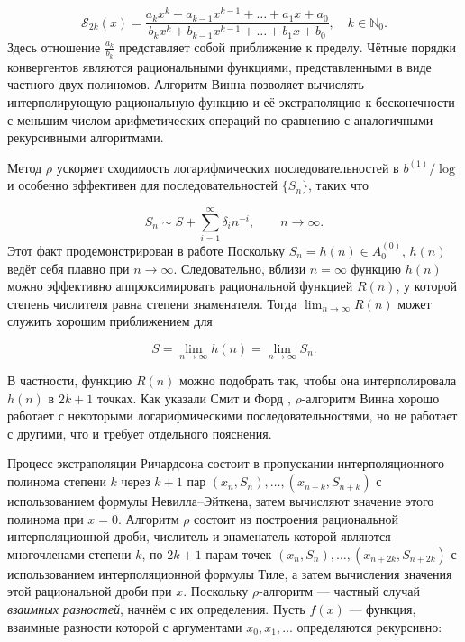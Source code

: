 \documentclass[14pt, a4paper]{extarticle}
\theoremstyle{definition}
\theoremstyle{remark}
\begin{document}
\[
\mathcal{S}_{2k}(x) =
\frac{a_{k}x^{k} + a_{k - 1}x^{k - 1} + \ldots + a_{1}x + a_{0}}
     {b_{k}x^{k} + b_{k - 1}x^{k - 1} + \ldots + b_{1}x + b_{0}},
\quad k \in \mathbb{N}_{0}.
\]
Здесь отношение \(\frac{a_{k}}{b_{k}}\) представляет собой приближение к
пределу. Чётные порядки конвергентов являются рациональными функциями,
представленными в виде частного двух полиномов. Алгоритм Винна позволяет
вычислять интерполирующую рациональную функцию и её экстраполяцию к
бесконечности с меньшим числом арифметических операций по сравнению с
аналогичными рекурсивными алгоритмами.

Метод \(\rho\) ускоряет сходимость логарифмических последовательностей в
\(b^{(1)}/\log\) и особенно эффективен для последовательностей
\(\{ S_{n} \}\), таких что

\[
S_{n} \sim S + \sum_{i = 1}^{\infty} \delta_{i} n^{-i},
\qquad n \to \infty.
\]
Этот факт продемонстрирован в работе \cite{Weniger2003}
Поскольку \(S_{n} = h(n) \in A_{0}^{(0)}\),
\(h(n)\) ведёт себя плавно при \(n \to \infty\).
Следовательно, вблизи \(n = \infty\) функцию \(h(n)\)
можно эффективно аппроксимировать рациональной функцией \(R(n)\),
у которой степень числителя равна степени знаменателя.
Тогда \(\lim_{n \to \infty} R(n)\) может служить хорошим приближением для

\[
S = \lim_{n \to \infty} h(n) = \lim_{n \to \infty} S_{n}.
\]

В частности, функцию \(R(n)\) можно подобрать так, чтобы она интерполировала
\(h(n)\) в \(2k+1\) точках.
Как указали Смит и Форд \cite{Smith-Ford},  \(\rho\)-алгоритм Винна хорошо работает с
некоторыми логарифмическими последовательностями, но не работает с
другими, что и требует отдельного пояснения.

Процесс экстраполяции Ричардсона состоит в пропускании интерполяционного
полинома степени \(k\) через \(k + 1\) пар \((x_{n}, S_{n}), \ldots,
(x_{n+k}, S_{n+k})\) с использованием формулы Невилла–Эйткена,
затем вычисляют значение этого полинома при \(x = 0\).
Алгоритм \(\rho\) состоит из построения рациональной интерполяционной
дроби, числитель и знаменатель которой являются многочленами степени \(k\),
по \(2k+1\) парам точек \((x_{n}, S_{n}), \ldots, (x_{n+2k}, S_{n+2k})\)
с использованием интерполяционной формулы Тиле, а затем вычисления значения
этой рациональной дроби при \(x\).
Поскольку \(\rho\)-алгоритм — частный случай \emph{взаимных разностей},
начнём с их определения. Пусть \(f(x)\) — функция, взаимные разности которой
с аргументами \(x_{0}, x_{1}, \ldots\) определяются рекурсивно:
\end{document}
